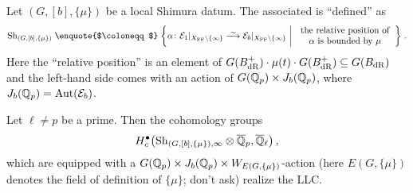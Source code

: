\documentclass[a4paper, 10pt, oneside, DIV=9, chapterprefix=true, numbers=enddot,bibliography=totoc]{scrbook}
\begin{document}
\begin{defi}
	Let $(G,[b],\{\mu\})$ be a local Shimura datum. The associated  is \enquote{defined} as
	\begin{equation*}
		\operatorname{Sh}_{(G,[b],\{\mu\})}\mathrel{\text{\enquote{$\coloneqq$}}}\left\{\alpha\colon \Ee_1|_{X_\FFC\setminus \{\infty\}}\isomorphism \Ee_b|_{X_\FFC\setminus\{\infty\}}\st \begin{tabular}{c}
		the relative position of\\
		$\alpha$ is bounded by $\mu$
		\end{tabular}\right\}\,.
	\end{equation*}
	Here the \enquote{relative position} is an element of $G(B_{\mathrm{dR}}^+)\cdot\mu(t)\cdot G(B_{\mathrm{dR}}^+)\subseteq G(B_{\mathrm{dR}})$ and the left-hand side comes with an action of $G(\mathbb{Q}_p)\times J_b(\mathbb{Q}_p)$, where $J_b(\mathbb{Q}_p)=\operatorname{Aut}(\mathcal{E}_b)$.
\end{defi}
\begin{conj}
	Let $\ell\neq p$ be a prime. Then the cohomology groups
	\begin{equation*}
		H_c^\bullet\big({\operatorname{Sh}_{(G,[b],\{\mu\}),\infty}}\otimes {\ov{\IQ}_p},\ov{\IQ}_\ell\big)\,,
	\end{equation*}
	which are equipped with a $G(\mathbb{Q}_p)\times J_b(\mathbb{Q}_p)\times W_{E(G,\{\mu\})}$-action (here $E(G,\{\mu\})$ denotes the field of definition of $\{\mu\}$; don't ask) realize the LLC.
\end{conj}

\appendix

\backmatter{}
\printbibliography
\end{document}
